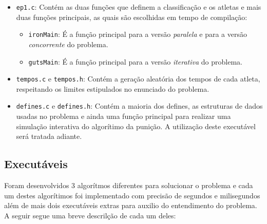 \documentclass[12pt,a4paper]{article}
\begin{document}
\begin{itemize}
\item \verb+ep1.c+: Contém as duas funções que definem a classificação e os atletas e mais duas funções principais, as quais são escolhidas em tempo de compilação:
\begin{itemize}
\item \verb+ironMain+: É a função principal para a versão \textit{paralela} e para a versão \textit{concorrente} do problema.
\item \verb+gutsMain+: É a função principal para a versão \textit{iterativa} do problema.
\end{itemize}
\item \verb+tempos.c+ e \verb+tempos.h+: Contém a geração aleatória dos tempos de cada atleta, respeitando os limites estipulados no enunciado do problema.
\item \verb+defines.c+ e \verb+defines.h+:  Contém a maioria dos defines, as estruturas de dados usadas no problema e ainda uma função principal para realizar uma simulação interativa do algorítimo da punição. A utilização deste executável será tratada adiante.
\end{itemize}

\subsection{Executáveis}

Foram desenvolvidos 3 algorítmos diferentes para solucionar o problema e cada um destes algorítimos foi implementado com precisão de segundos e milisegundos além de mais dois executáveis extras para auxilio do entendimento do problema. A seguir segue uma breve descrilção de cada um deles: 
\end{document}
